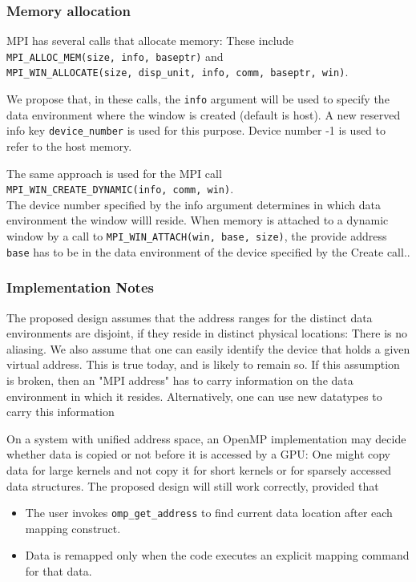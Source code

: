 \subsubsection{Memory allocation}

MPI has several calls that allocate memory: These include\\ 
\texttt{MPI\_ALLOC\_MEM(size, info, baseptr)} and\\ 
\texttt{MPI\_WIN\_ALLOCATE(size, disp\_unit, info, comm, baseptr, win)}.

We propose that, in these calls, the \texttt{info} argument will be used to 
specify the data environment where the window is created (default is host). A 
new reserved info key \texttt{device\_number} is used for this purpose. Device 
number -1 is 
used to refer to the host memory.

The same approach is used for the MPI call\\ 
\texttt{MPI\_WIN\_CREATE\_DYNAMIC(info, comm, win)}.\\ The device number 
specified by the info argument determines in which data environment the window 
willl reside. When memory is attached to a dynamic window by a call to 
\texttt{MPI\_WIN\_ATTACH(win, base, size)}, the provide address \texttt{base} 
has to be in the data environment of the device specified by the Create call..

\subsubsection{Implementation Notes}

The proposed design assumes that the address ranges for the distinct data 
environments are disjoint, if they reside in distinct physical locations: There 
is no 
aliasing. We also assume that one can easily identify the device that holds a 
given virtual address. This is true today, and is likely to remain so. If this 
assumption is broken, then an "MPI address" has to carry information on the 
data environment in which it resides. Alternatively, one can use new datatypes 
to carry this information \cite{aji2016mpi}

On a system with unified address space, an OpenMP implementation may decide 
whether data is copied or not before it is accessed by a GPU: One might copy 
data for large kernels and not copy it for short kernels or for sparsely 
accessed data structures. The proposed design will still work correctly, 
provided that

\begin{itemize}
	\item 
	The user invokes \texttt{omp\_get\_address} to find current data location 
	after each mapping construct.
	\item Data is remapped only when the code executes an explicit mapping 
	command for that data. 
\end{itemize}


